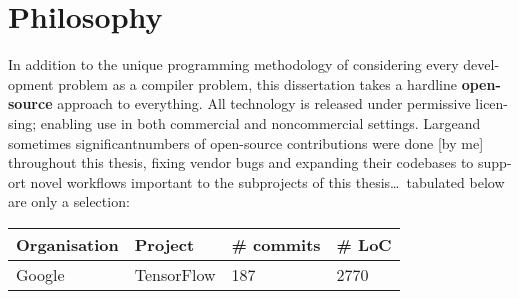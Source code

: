 \section{Philosophy}

In addition to the unique programming methodology of considering every devel-\\opment problem as a compiler problem, this dissertation takes a hardline \textbf{open-source} approach to everything. All technology is released under permissive licen-\\sing; enabling use in both commercial and noncommercial settings. Large\textemdash{}and sometimes significant\textemdash{}numbers of open-source contributions were done [by me] throughout this thesis, fixing vendor bugs and expanding their codebases to supp-\\ort novel workflows important to the subprojects of this thesis\ldots~tabulated below are only a selection:

\begin{tabularx}{\textwidth}{|X|X|X|X|}
    \hline
    \textbf{Organisation} & \textbf{Project} & \textbf{\# commits} & \textbf{\# LoC} \\
    \hline
    Google & TensorFlow & 187 & 2770 \\
    \hline
\end{tabularx}

\clearpage



